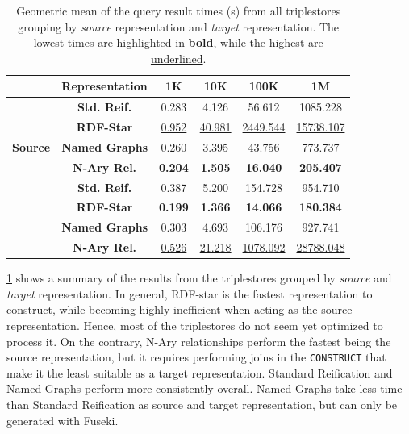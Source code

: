\begin{table}[t!]
\caption[Execution time results for re-construction evaluation with triplestores]{Geometric mean of the query result times (s) from all triplestores grouping by \textit{source} representation and \textit{target} representation. The lowest times are highlighted in \textbf{bold}, while the highest are \underline{underlined}.}
\centering
\label{tab:chp6-1_closeup-queries}
\begin{tabular}{cccccc}
    \cmidrule{2-6}
 & \textbf{Representation} & \textbf{1K} & \textbf{10K} & \textbf{100K} & \textbf{1M} \\ \midrule
 \multirow{5}{*}{\textbf{Source}} & \textbf{Std. Reif.} & 0.283 & 4.126 & 56.612 & 1085.228  \\ \cmidrule{2-6}
  & \textbf{RDF-Star} & \underline{0.952} & \underline{40.981} & \underline{2449.544} & \underline{15738.107}  \\ \cmidrule{2-6}
  & \textbf{Named Graphs} & 0.260 & 3.395 & 43.756 & 773.737 \\ \cmidrule{2-6}
 & \textbf{N-Ary Rel.} & \textbf{0.204} & \textbf{1.505} & \textbf{16.040} & \textbf{205.407}  \\ \midrule
 \multirow{5}{*}{\textbf{Target}} & \textbf{Std. Reif.} & 0.387 & 5.200 & 154.728 & 954.710  \\ \cmidrule{2-6}
  & \textbf{RDF-Star} & \textbf{0.199} & \textbf{1.366} & \textbf{14.066} & \textbf{180.384} \\ \cmidrule{2-6}
  & \textbf{Named Graphs}  & 0.303 & 4.693 & 106.176 & 927.741 \\ \cmidrule{2-6}
 \ & \textbf{N-Ary Rel.} & \underline{0.526} & \underline{21.218} & \underline{1078.092} & \underline{28788.048} \\   \bottomrule
\end{tabular}
\end{table}

\cref{tab:chp6-1_closeup-queries} shows a summary of the results from the triplestores grouped by \textit{source} and \textit{target} representation. In general, RDF-star is the fastest representation to construct, while becoming highly inefficient when acting as the source representation. Hence, most of the triplestores do not seem yet optimized to process it. On the contrary, N-Ary relationships perform the fastest being the source representation, but it requires performing joins in the \texttt{CONSTRUCT} that make it the least suitable as a target representation. Standard Reification and Named Graphs perform more consistently overall. Named Graphs take less time than Standard Reification as source and target representation, but can only be generated with Fuseki. 

